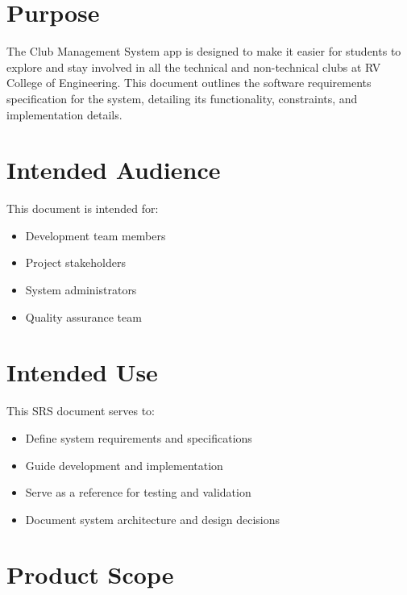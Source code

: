 \section{Purpose}
The Club Management System app is designed to make it easier for students to explore and stay involved in all the technical and non-technical clubs at RV College of Engineering. This document outlines the software requirements specification for the system, detailing its functionality, constraints, and implementation details.

\section{Intended Audience}
This document is intended for:
\begin{itemize}
    \item Development team members
    \item Project stakeholders
    \item System administrators
    \item Quality assurance team
\end{itemize}

\section{Intended Use}
This SRS document serves to:
\begin{itemize}
    \item Define system requirements and specifications
    \item Guide development and implementation
    \item Serve as a reference for testing and validation
    \item Document system architecture and design decisions
\end{itemize}

\section{Product Scope}
